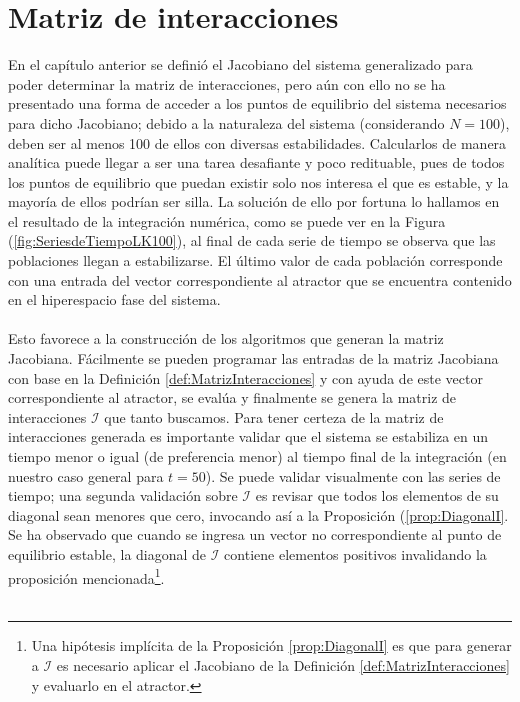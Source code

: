 \section{Matriz de interacciones}

En el capítulo anterior se definió el Jacobiano del sistema generalizado para poder determinar la matriz de interacciones, pero aún con ello no se ha presentado una forma de acceder a los puntos de equilibrio del sistema necesarios para dicho Jacobiano; debido a la naturaleza del sistema (considerando $N=100$), deben ser al menos 100 de ellos con diversas estabilidades. Calcularlos de manera analítica puede llegar a ser una tarea desafiante y poco redituable, pues de todos los puntos de equilibrio que puedan existir solo nos interesa el que es estable, y la mayoría de ellos podrían ser silla. La solución de ello por fortuna lo hallamos en el resultado de la integración numérica, como se puede ver en la Figura (\ref{fig:SeriesdeTiempoLK100}), al final de cada serie de tiempo se observa que las poblaciones llegan a estabilizarse. El último valor de cada población corresponde con una entrada del vector correspondiente al atractor que se encuentra contenido en el hiperespacio fase del sistema.\\
\\
Esto favorece a la construcción de los algoritmos que generan la matriz Jacobiana. Fácilmente se pueden programar las entradas de la matriz Jacobiana con base en la Definición \ref{def:MatrizInteracciones} y con ayuda de este vector correspondiente al atractor, se evalúa y finalmente se genera la matriz de interacciones $\mathcal{I}$ que tanto buscamos. Para tener certeza de la matriz de interacciones generada es importante validar que el sistema se estabiliza en un tiempo menor o igual (de preferencia menor) al tiempo final de la integración (en nuestro caso general para $t=50$). Se puede validar visualmente con las series de tiempo; una segunda validación sobre $\mathcal{I}$ es revisar que todos los elementos de su diagonal sean menores que cero, invocando así a la Proposición (\ref{prop:DiagonalI}. Se ha observado que cuando se ingresa un vector no correspondiente al punto de equilibrio estable, la diagonal de $\mathcal{I}$ contiene elementos positivos invalidando la proposición mencionada\footnote{Una hipótesis implícita de la Proposición \ref{prop:DiagonalI} es que para generar a $\mathcal{I}$ es necesario aplicar el Jacobiano de la Definición \ref{def:MatrizInteracciones} y evaluarlo en el atractor.}.
\\
\\
